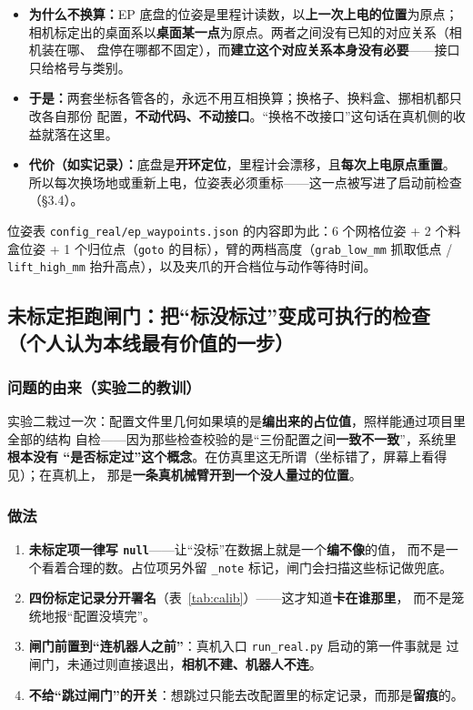 \documentclass[12pt,a4paper]{ctexart}
\begin{document}
\begin{itemize}[leftmargin=1.6em]
  \item \textbf{为什么不换算：}EP 底盘的位姿是里程计读数，以\textbf{上一次上电的位置}为原点；
        相机标定出的桌面系以\textbf{桌面某一点}为原点。两者之间没有已知的对应关系（相机装在哪、
        盘停在哪都不固定），而\textbf{建立这个对应关系本身没有必要}——接口只给格号与类别。
  \item \textbf{于是：}两套坐标各管各的，永远不用互相换算；换格子、换料盒、挪相机都只改各自那份
        配置，\textbf{不动代码、不动接口}。“换格不改接口”这句话在真机侧的收益就落在这里。
  \item \textbf{代价（如实记录）：}底盘是\textbf{开环定位}，里程计会漂移，且\textbf{每次上电原点重置}。
        所以每次换场地或重新上电，位姿表必须重标——这一点被写进了启动前检查（§3.4）。
\end{itemize}

位姿表 \texttt{config\_real/ep\_waypoints.json} 的内容即为此：6 个网格位姿 + 2 个料盒位姿 +
1 个归位点（\texttt{goto} 的目标），臂的两档高度（\texttt{grab\_low\_mm} 抓取低点 /
\texttt{lift\_high\_mm} 抬升高点），以及夹爪的开合档位与动作等待时间。

\subsection{未标定拒跑闸门：把“标没标过”变成可执行的检查（个人认为本线最有价值的一步）}

\subsubsection*{问题的由来（实验二的教训）}

实验二栽过一次：配置文件里几何如果填的是\textbf{编出来的占位值}，照样能通过项目里全部的结构
自检——因为那些检查校验的是“三份配置之间\textbf{一致不一致}”，系统里\textbf{根本没有
“是否标定过”这个概念}。在仿真里这无所谓（坐标错了，屏幕上看得见）；在真机上，
那是\textbf{一条真机械臂开到一个没人量过的位置}。

\subsubsection*{做法}

\begin{enumerate}[leftmargin=1.8em]
  \item \textbf{未标定项一律写 \texttt{null}}——让“没标”在数据上就是一个\textbf{编不像}的值，
        而不是一个看着合理的数。占位项另外留 \texttt{\_note} 标记，闸门会扫描这些标记做兜底。
  \item \textbf{四份标定记录分开署名}（表~\ref{tab:calib}）——这才知道\textbf{卡在谁那里}，
        而不是笼统地报“配置没填完”。
  \item \textbf{闸门前置到“连机器人之前”}：真机入口 \texttt{run\_real.py} 启动的第一件事就是
        过闸门，未通过则直接退出，\textbf{相机不建、机器人不连}。
  \item \textbf{不给“跳过闸门”的开关}：想跳过只能去改配置里的标定记录，而那是\textbf{留痕}的。
\end{enumerate}
\end{document}
